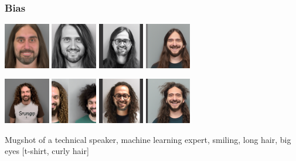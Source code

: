 \documentclass[17pt,aspectratio=169,hyperref={pdfusetitle,colorlinks,allcolors=olive}]{beamer}
\begin{document}
\begin{frame}[fragile]
  \frametitle{Bias}

    \includegraphics[width=2cm]{figs/17a}
    \includegraphics[width=2cm]{figs/17b}
    \includegraphics[width=2cm]{figs/17c}
    \includegraphics[width=2cm]{figs/17d}
  
    \includegraphics[width=2cm]{figs/18a}
    \includegraphics[width=2cm]{figs/18b}
    \includegraphics[width=2cm]{figs/18c}
    \includegraphics[width=2cm]{figs/18d}

    {\small
      Mugshot of a technical speaker, machine learning expert, smiling, long hair, big eyes [t-shirt, curly hair]
    }

\end{frame}
\end{document}
